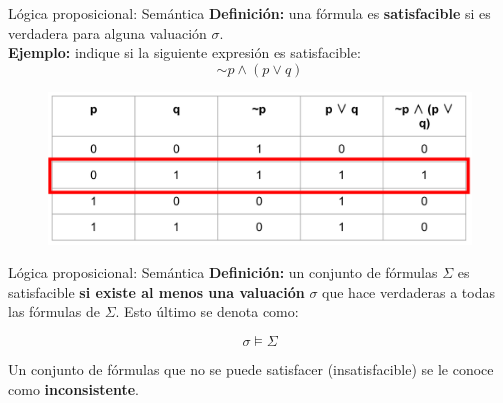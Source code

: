 \documentclass{beamer}
\begin{document}
\begin{frame}{Lógica proposicional: Semántica}
  \textbf{Definición:} una fórmula es \textbf{satisfacible} si es verdadera para
  alguna valuación $\sigma$.\\

  \textbf{Ejemplo:} indique si la siguiente expresión es satisfacible:
  $$\sim p \land (p \vee q)$$

  \begin{figure}
    \centering
    \includegraphics[width=1.\textwidth]{images/tabla_de_verdad_01_rojo.png}
  \end{figure}
\end{frame}


\begin{frame}{Lógica proposicional: Semántica}
  \textbf{Definición:} un conjunto de fórmulas $\Sigma$ es satisfacible
  \textbf{si existe al menos una valuación} $\sigma$ que hace verdaderas a todas
  las fórmulas de $\Sigma$. Esto último se denota como:

  $$\sigma \vDash \Sigma$$

  Un conjunto de fórmulas que no se puede satisfacer (insatisfacible) se le
  conoce como \textbf{inconsistente}.
\end{frame}
\end{document}
